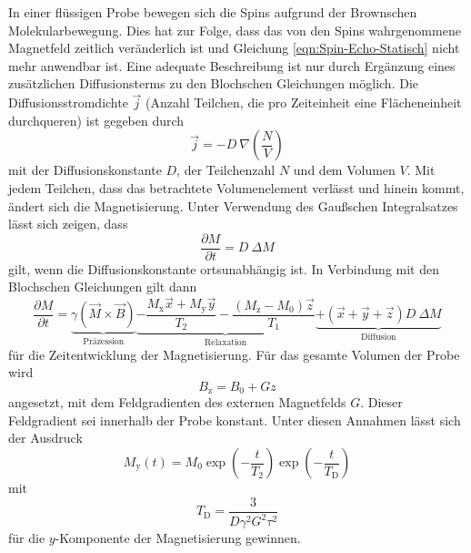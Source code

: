 In einer flüssigen Probe bewegen sich die Spins aufgrund der Brownschen
Molekularbewegung.
Dies hat zur Folge, dass das von den Spins wahrgenommene Magnetfeld
zeitlich veränderlich ist und Gleichung \eqref{eqn:Spin-Echo-Statisch} nicht mehr
anwendbar ist.
Eine adequate Beschreibung ist nur durch Ergänzung eines zusätzlichen Diffusionsterms
zu den Blochschen Gleichungen möglich.
Die Diffusionsstromdichte $\vec{j}$ (Anzahl Teilchen, die pro Zeiteinheit eine
Flächeneinheit durchqueren) ist gegeben durch
\begin{equation*}
  \vec{j} = - D\:\nabla\!\left(\frac{N}{V}\right)
\end{equation*}
mit der Diffusionskonstante $D$, der Teilchenzahl $N$ und dem Volumen $V$.
Mit jedem Teilchen, dass das betrachtete Volumenelement verlässt und hinein kommt,
ändert sich die Magnetisierung.
Unter Verwendung des Gaußschen Integralsatzes lässt sich zeigen, dass
\begin{equation*}
  \frac{\partial M}{\partial t} = D\:\Delta M
\end{equation*}
gilt, wenn die Diffusionskonstante ortsunabhängig ist.
In Verbindung mit den Blochschen Gleichungen gilt dann
\begin{equation*}
  \frac{\partial M}{\partial t} =
  \underbrace{\gamma \left(\vec{M} \times \vec{B}\right)}_{\text{Präzession}}
  \underbrace{- \frac{M_\text{x} \vec{x} + M_\text{y} \vec{y}}{T_2}
  - \frac{\left(M_\text{z} - M_0\right) \vec{z}}{T_1}}_{\text{Relaxation}}
  \underbrace{+ \left(\vec{x} + \vec{y} + \vec{z}\right) D\:\Delta M}_{\text{Diffusion}}
\end{equation*}
für die Zeitentwicklung der Magnetisierung.
Für das gesamte Volumen der Probe wird
\begin{equation*}
  B_\text{z} = B_0 + G z
\end{equation*}
angesetzt, mit dem Feldgradienten des externen Magnetfelds $G$.
Dieser Feldgradient sei innerhalb der Probe konstant.
Unter diesen Annahmen lässt sich der Ausdruck
\begin{equation*}
  M_\text{y}\!\left(t\right) = M_0
  \exp\!\left(- \frac{t}{T_2}\right)
  \exp\!\left(- \frac{t}{T_\text{D}}\right)
\end{equation*}
mit
\begin{equation*}
  T_\text{D} = \frac{3}{D \gamma^2 G^2 \tau^2}
\end{equation*}
für die $y$-Komponente der Magnetisierung gewinnen.
